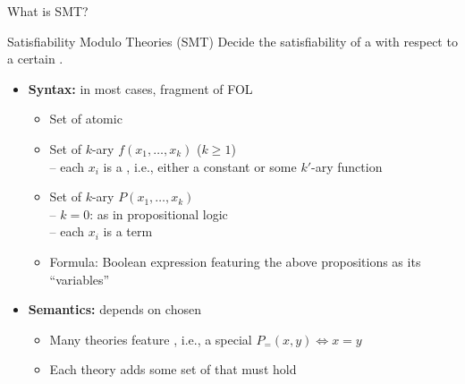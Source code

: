 \documentclass[t,english]{sdqbeamer}
\begin{document}
\begin{frame}{What is SMT?}
	\begin{block}{Satisfiability Modulo Theories (SMT)}
		Decide the satisfiability of a  with respect to a certain .
	\end{block}
	
	\vspace*{4mm}
	\begin{itemize}\setlength{\itemsep}{1ex}
		\item \textbf{Syntax:} in most cases,  fragment of FOL
		\begin{itemize}
			\item Set of atomic  \hfill {}
			\item Set of $k$-ary  $f(x_1, \ldots, x_k)$ ($k \geq 1$) \hfill {}\\
			-- each $x_i$ is a , i.e., either a constant or some $k'$-ary function
			\vspace*{1mm}
			\item Set of $k$-ary  $P(x_1, \ldots, x_k)$  \hfill {}\\
			-- $k=0$:  as in propositional logic\\
			-- each $x_i$ is a term
			\vspace*{1mm}
			\item Formula: Boolean expression featuring the above propositions as its ``variables''
		\end{itemize}
		\pause
		\item \textbf{Semantics:} depends on chosen 
		\begin{itemize}
			\item Many theories feature , i.e., a special  $P_=(x,y) \Leftrightarrow x=y$
			\item Each theory adds some set of  that must hold
		\end{itemize}
	\end{itemize}
\end{frame}
\end{document}
